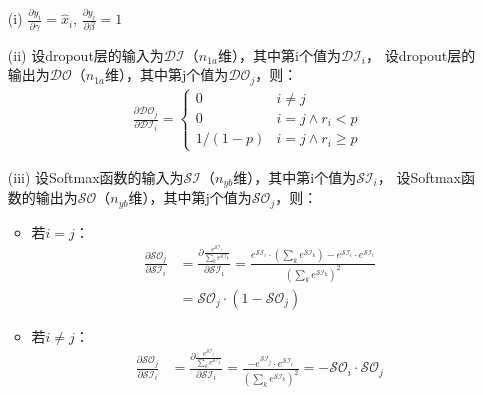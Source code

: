 \begin{solution}
    \begin{enumerate}
        \item[(i)] 
        $\frac{\partial y_i}{\partial\gamma} = \hat{x}_i$, 
        $\frac{\partial y_i}{\partial\beta} = 1$
        \item[(ii)]设dropout层的输入为$\mathcal{DI}$（$n_{1a}$维），其中第i个值为$\mathcal{DI}_i$，
        设dropout层的输出为$\mathcal{DO}$（$n_{1a}$维），其中第j个值为$\mathcal{DO}_j$，则：
        \begin{align*}
            \frac{\partial \mathcal{DO}_j}{\partial \mathcal{DI}_i} = 
            \begin{cases}
                0 & i\neq j\\
                0 & i=j \wedge r_i<p\\
                1/(1-p) & i=j \wedge r_i\ge p
            \end{cases}
        \end{align*}
        \item[(iii)]设Softmax函数的输入为$\mathcal{SI}$（$n_{yb}$维），其中第i个值为$\mathcal{SI}_i$，
        设Softmax函数的输出为$\mathcal{SO}$（$n_{yb}$维），其中第j个值为$\mathcal{SO}_j$，则：
        \begin{itemize}
            \item 若$i=j$：
            \begin{align*}
                \frac{\partial \mathcal{SO}_j}{\partial \mathcal{SI}_i} &= \frac{\partial \frac{e^{\mathcal{SI}_i}}{\sum_k e^{\mathcal{SI}_k}}}{\partial \mathcal{SI}_i}
                =\frac{e^{\mathcal{SI}_i}\cdot (\sum_k e^{\mathcal{SI}_k})-e^{\mathcal{SI}_i}\cdot e^{\mathcal{SI}_i}}{(\sum_k e^{\mathcal{SI}_k})^2}\\
                &=\mathcal{SO}_j\cdot(1-\mathcal{SO}_j)
            \end{align*}
            \item 若$i\neq j$：
            \begin{align*}
                \frac{\partial \mathcal{SO}_j}{\partial \mathcal{SI}_i} &= \frac{\partial \frac{e^{\mathcal{SI}_j}}{\sum_k e^{\mathcal{SI}_k}}}{\partial \mathcal{SI}_i}
                =\frac{-e^{\mathcal{SI}_j}\cdot e^{\mathcal{SI}_i}}{(\sum_k e^{\mathcal{SI}_k})^2}
                =-\mathcal{SO}_i\cdot\mathcal{SO}_j
            \end{align*}
        \end{itemize}
        
    \end{enumerate}
\end{solution}